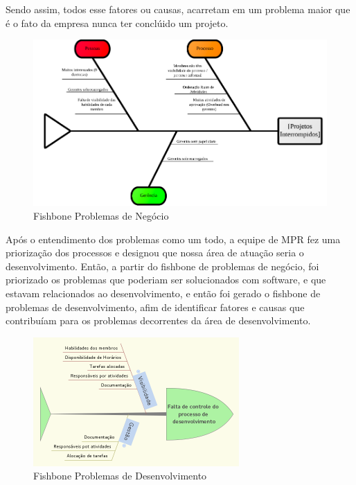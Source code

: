 	Sendo assim, todos esse fatores ou causas, acarretam em um problema maior que é o fato da empresa nunca ter conclúido um projeto. 

  \begin{figure}[H]
    \center
    \includegraphics[width=1.0\textwidth]{figuras/fishbone-mpr}
    \caption{Fishbone Problemas de Negócio}
    \label{fig:fishbone_mpr}
  \end{figure}



  Após o entendimento dos problemas como um todo, a equipe de MPR fez uma priorização dos processos e designou que nossa área de atuação seria o desenvolvimento. Então, a partir do fishbone de problemas de negócio, foi priorizado os problemas que poderiam ser solucionados com software, e que estavam relacionados ao desenvolvimento, e então foi gerado o fishbone de problemas de desenvolvimento, afim de identificar fatores e causas que contribuíam para os problemas decorrentes da área de desenvolvimento.

  \begin{figure}[H]
    \center
    \includegraphics[width=0.7\textwidth]{figuras/fishbone-requisitos}
    \caption{Fishbone Problemas de Desenvolvimento}
    \label{fig:fishbone_requisitos}
  \end{figure}

